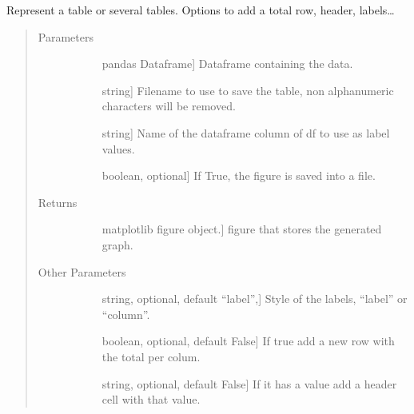 \documentclass[letterpaper,10pt,english]{sphinxmanual}
\begin{document}
\begin{fulllineitems}
\label{\detokenize{rstFiles/enhancedTable:enhancedTable.enhancedTable}}
Represent a table or several tables. 
Options to add a total row, header, labels…
\begin{quote}\begin{description}
\item[{Parameters}] \leavevmode\begin{description}
\item[{}] \leavevmode{[}pandas Dataframe{]}
Dataframe containing the data.

\item[{}] \leavevmode{[}string{]}
Filename to use to save the table, 
non alphanumeric characters will be removed.

\item[{}] \leavevmode{[}string{]}
Name of the dataframe column of df to use as label values.

\item[{}] \leavevmode{[}boolean, optional{]}
If True, the figure is saved into a file.

\end{description}

\item[{Returns}] \leavevmode\begin{description}
\item[{}] \leavevmode{[}matplotlib figure object.{]}
figure that stores the generated graph.

\end{description}

\item[{Other Parameters}] \leavevmode\begin{description}
\item[{}] \leavevmode{[}string, optional, default “label”,{]}
Style of the labels, “label” or “column”.

\item[{}] \leavevmode{[}boolean, optional, default False{]}
If true add a new row with the total per colum.

\item[{}] \leavevmode{[}string, optional, default False{]}
If it has a value add a header cell with that value.


\end{description}
\end{description}
\end{quote}
\end{fulllineitems}
\end{document}

